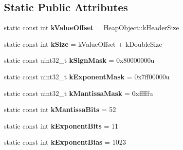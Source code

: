 \subsection*{Static Public Attributes}
\begin{DoxyCompactItemize}
\item 
\hypertarget{classv8_1_1internal_1_1_heap_number_a52b57ba48e6335c63496c78cd666c88b}{}static const int {\bfseries k\+Value\+Offset} = Heap\+Object\+::k\+Header\+Size\label{classv8_1_1internal_1_1_heap_number_a52b57ba48e6335c63496c78cd666c88b}

\item 
\hypertarget{classv8_1_1internal_1_1_heap_number_ab06326529091d16f4421faa17e04fb2a}{}static const int {\bfseries k\+Size} = k\+Value\+Offset + k\+Double\+Size\label{classv8_1_1internal_1_1_heap_number_ab06326529091d16f4421faa17e04fb2a}

\item 
\hypertarget{classv8_1_1internal_1_1_heap_number_a50eaa87f7bf62832731d20f644d4a33e}{}static const uint32\+\_\+t {\bfseries k\+Sign\+Mask} = 0x80000000u\label{classv8_1_1internal_1_1_heap_number_a50eaa87f7bf62832731d20f644d4a33e}

\item 
\hypertarget{classv8_1_1internal_1_1_heap_number_a5fc3ecac0d194d03ccc4eabc9b3f5023}{}static const uint32\+\_\+t {\bfseries k\+Exponent\+Mask} = 0x7ff00000u\label{classv8_1_1internal_1_1_heap_number_a5fc3ecac0d194d03ccc4eabc9b3f5023}

\item 
\hypertarget{classv8_1_1internal_1_1_heap_number_a53057546a7ea98c7bfab2a274f06079f}{}static const uint32\+\_\+t {\bfseries k\+Mantissa\+Mask} = 0xfffffu\label{classv8_1_1internal_1_1_heap_number_a53057546a7ea98c7bfab2a274f06079f}

\item 
\hypertarget{classv8_1_1internal_1_1_heap_number_a3a9f18d204db4321136c3263b54eadbd}{}static const int {\bfseries k\+Mantissa\+Bits} = 52\label{classv8_1_1internal_1_1_heap_number_a3a9f18d204db4321136c3263b54eadbd}

\item 
\hypertarget{classv8_1_1internal_1_1_heap_number_a7badd159303921f42ed5c74ad7c9fa00}{}static const int {\bfseries k\+Exponent\+Bits} = 11\label{classv8_1_1internal_1_1_heap_number_a7badd159303921f42ed5c74ad7c9fa00}

\item 
\hypertarget{classv8_1_1internal_1_1_heap_number_a87eae572809064057a6641c6b5805b42}{}static const int {\bfseries k\+Exponent\+Bias} = 1023\label{classv8_1_1internal_1_1_heap_number_a87eae572809064057a6641c6b5805b42}


\end{DoxyCompactItemize}
